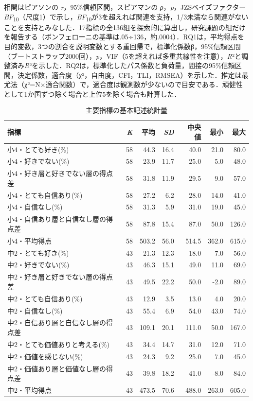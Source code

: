 \documentclass[a4paper,10pt,twocolumn]{ltjsarticle}
\begin{document}
相関はピアソンの \textit{r}，95\%信頼区間，スピアマンの \textit{ρ}，\textit{p}，JZSベイズファクター\textit{BF}\textsubscript{10}（尺度1）で示し，\textit{BF}\textsubscript{10}が3を超えれば関連を支持，1/3未満なら関連がないことを支持とみなした．17指標の全136組を探索的に算出し，研究課題の組だけを報告する（ボンフェローニの基準は.05÷136，約.0004）．RQ1は，平均得点を目的変数，3つの割合を説明変数とする重回帰で，標準化係数β，95\%信頼区間（ブートストラップ2000回），\textit{p}，VIF（5を超えれば多重共線性を注意），\textit{R}²と調整済み\textit{R}²を示した．RQ2は，標準化したパス係数と負荷量，間接の95\%信頼区間，決定係数，適合度（χ²，自由度，CFI，TLI，RMSEA）を示した．推定は最尤法（χ²=N×適合関数）で，適合度は観測数が少ないので目安である．頑健性として1か国ずつ除く場合と上位5を除く場合も計算した．
\begin{table}[!t]
\caption{主要指標の基本記述統計量}
\centering\small
\begin{tabular}{>{\raggedright\arraybackslash}p{9.2cm}rrrrrr}
\toprule
指標 & \textit{K} & 平均 & \textit{SD} & 中央値 & 最小 & 最大 \\
\midrule
小4・とても好き(\%) & 58 & 44.3 & 16.4 & 40.0 & 21.0 & 80.0 \\
小4・好きでない(\%) & 58 & 23.9 & 11.7 & 25.0 & 5.0 & 48.0 \\
小4・好き層と好きでない層の得点差 & 58 & 31.8 & 11.9 & 29.5 & 9.0 & 57.0 \\
小4・とても自信あり(\%) & 58 & 27.2 & 6.2 & 28.0 & 14.0 & 41.0 \\
小4・自信なし(\%) & 58 & 31.3 & 5.9 & 31.0 & 19.0 & 45.0 \\
小4・自信あり層と自信なし層の得点差 & 58 & 87.8 & 15.4 & 87.0 & 50.0 & 126.0 \\
小4・平均得点 & 58 & 503.2 & 56.0 & 514.5 & 362.0 & 615.0 \\
中2・とても好き(\%) & 43 & 21.3 & 12.3 & 18.0 & 7.0 & 56.0 \\
中2・好きでない(\%) & 43 & 46.3 & 15.1 & 49.0 & 11.0 & 69.0 \\
中2・好き層と好きでない層の得点差 & 43 & 49.5 & 22.2 & 50.0 & -2.0 & 89.0 \\
中2・とても自信あり(\%) & 43 & 12.9 & 3.5 & 13.0 & 4.0 & 20.0 \\
中2・自信なし(\%) & 43 & 55.4 & 6.9 & 54.0 & 43.0 & 74.0 \\
中2・自信あり層と自信なし層の得点差 & 43 & 109.1 & 20.1 & 111.0 & 50.0 & 167.0 \\
中2・とても価値ありと考える(\%) & 43 & 34.4 & 14.7 & 31.0 & 12.0 & 71.0 \\
中2・価値を感じない(\%) & 43 & 24.3 & 9.2 & 25.0 & 7.0 & 45.0 \\
中2・価値あり層と価値なし層の得点差 & 43 & 39.8 & 18.2 & 41.0 & -8.0 & 84.0 \\
中2・平均得点 & 43 & 473.5 & 70.6 & 488.0 & 263.0 & 605.0 \\
\bottomrule
\end{tabular}
\par{}
\end{table}
\end{document}
